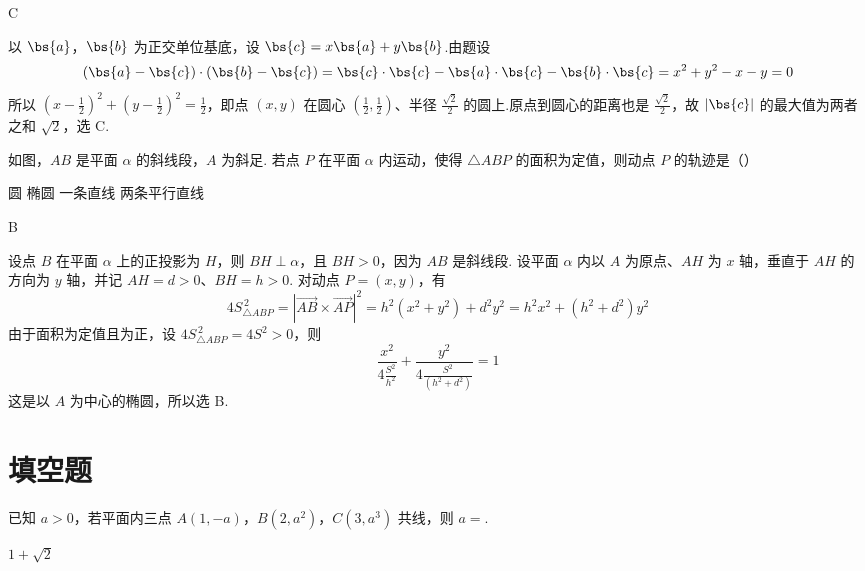 \begin{answer}
C
\end{answer}

\begin{solution}
以 \(\bs{a}\)，\(\bs{b}\) 为正交单位基底，设 \(\bs{c}=x\bs{a}+y\bs{b}\).由题设
\[
(\bs{a}-\bs{c})\cdot(\bs{b}-\bs{c})=\bs{c}\cdot\bs{c}-\bs{a}\cdot\bs{c}-\bs{b}\cdot\bs{c}=x^2+y^2-x-y=0
\]
所以 \(\left(x-\frac12\right)^2+\left(y-\frac12\right)^2=\frac12\)，即点 \((x,y)\) 在圆心
\(\left(\frac12,\frac12\right)\)、半径 \(\frac{\sqrt2}{2}\) 的圆上.原点到圆心的距离也是 \(\frac{\sqrt2}{2}\)，故
\(|\bs{c}|\) 的最大值为两者之和 \(\sqrt2\)，选 C.
\end{solution}

\begin{problem}
如图，\(AB\) 是平面 \(\alpha\) 的斜线段，\(A\) 为斜足. 若点 \(P\) 在平面 \(\alpha\) 内运动，使得 \(\triangle ABP\) 的面积为定值，则动点 \(P\) 的轨迹是（\quad）


\choices
    {圆}
    {椭圆}
    {一条直线}
    {两条平行直线}
\end{problem}

\begin{answer}
B
\end{answer}

\begin{solution}
设点 \(B\) 在平面 \(\alpha\) 上的正投影为 \(H\)，则 \(BH\perp\alpha\)，且 \(BH>0\)，因为 \(AB\) 是斜线段.
设平面 \(\alpha\) 内以 \(A\) 为原点、\(AH\) 为 \(x\) 轴，垂直于 \(AH\) 的方向为 \(y\) 轴，并记 \(AH=d>0\)、\(BH=h>0\). 对动点 \(P=(x,y)\)，有
\[
4S_{\triangle ABP}^{\,2}=|\overrightarrow{AB}\times\overrightarrow{AP}|^2
 =h^2(x^2+y^2)+d^2y^2=h^2x^2+(h^2+d^2)y^2
\]
由于面积为定值且为正，设 \(4S_{\triangle ABP}^{\,2}=4S^2>0\)，则
\[
\frac{x^2}{4\frac{S^2}{h^2}}+\frac{y^2}{4\frac{S^2}{(h^2+d^2)}}=1
\]
这是以 \(A\) 为中心的椭圆，所以选 B.
\end{solution}

\section{填空题}

\begin{problem}
已知 \(a > 0\)，若平面内三点 \(A(1, -a)\)，\(B(2, a^2)\)，\(C(3, a^3)\) 共线，则 \(a =\)\fillinblank{}.
\end{problem}

\begin{answer}
\(1+\sqrt{2}\)
\end{answer}

